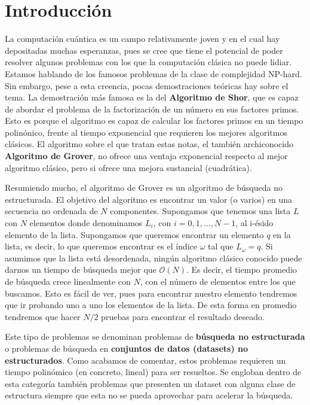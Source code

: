 \documentclass[a4paper,11pt]{article} %
\numberwithin{equation}{section}
\begin{document}
\newpage
\section{Introducción}

La computación cuántica es un campo relativamente joven y en el cual hay depositadas muchas esperanzas, pues se cree que tiene el potencial de poder resolver algunos problemas con los que la computación clásica no puede lidiar. Estamos hablando de los famosos problemas de la clase de complejidad NP-hard. Sin embargo, pese a esta creencia, pocas demostraciones teóricas hay sobre el tema. La demostración más famosa es la del \textbf{Algoritmo de Shor}, que es capaz de abordar el problema de la factorización de un número en sus factores primos. Esto es porque el algoritmo es capaz de calcular los factores primos en un tiempo polinónico, frente al tiempo exponencial que requieren los mejores algoritmos clásicos. El algoritmo sobre el que tratan estas notas, el también archiconocido \textbf{Algoritmo de Grover}, no ofrece una ventaja exponencial respecto al mejor algoritmo clásico, pero si ofrece una mejora sustancial (cuadrática).

Resumiendo mucho, el algoritmo de Grover es un algoritmo de búsqueda no estructurada. El objetivo del algoritmo es encontrar un valor (o varios) en una secuencia no ordenada de $N$ componentes. Supongamos que tenemos una lista $L$ con $N$ elementos donde denominamos $L_i$, con $i=0,1,\dots,N-1$, al i-ésido elemento de la lista. Supongamos que queremos encontrar un elemento $q$ en la lista, es decir, lo que queremos encontrar es el índice $\omega$ tal que $L_\omega = q$. Si asumimos que la lista está desordenada, ningún algoritmo clásico conocido puede darnos un tiempo de búsqueda mejor que $\mathcal{O}(N)$. Es decir, el tiempo promedio de búsqueda crece linealmente con $N$, con el número de elementos entre los que buscamos. Esto es fácil de ver, pues para encontrar nuestro elemento tendremos que ir probando uno a uno los elementos de la lista. De esta forma en promedio tendremos que hacer $N/2$ pruebas para encontrar el resultado deseado. 

Este tipo de problemas se denominan problemas de \textbf{búsqueda no estructurada} o problemas de búsqueda en \textbf{conjuntos de datos (datasets) no estructurados}. Como acabamos de comentar, estos problemas requieren un tiempo polinómico (en concreto, lineal) para ser resueltos. Se engloban dentro de esta categoría también problemas que presenten un dataset con alguna clase de estructura siempre que esta no se pueda aprovechar para acelerar la búsqueda. 
\end{document}
